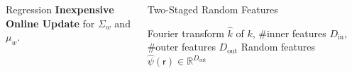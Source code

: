 \documentclass[english]{beamer}
\begin{document}
\begin{frame}
\begin{columns}[t]
\begin{block}{Regression}
\vspace{5mm}
\textbf{Inexpensive Online Update} for $\Sigma_w$ and $\mu_w$.
%

\end{block}





\begin{block}{Two-Staged Random Features }
\begin{algorithmic}[1]
\REQUIRE 
Fourier transform $\hat{k}$ of $k$, \#inner features $D_\mathrm{in}$, \#outer features $D_\mathrm{out}$
\ENSURE Random features $\hat{\psi}(\mathsf{r}) \in \mathbb{R}^{D_\mathrm{out}}$


\end{algorithmic}
\end{block}
\end{columns}
\end{frame}
\end{document}
